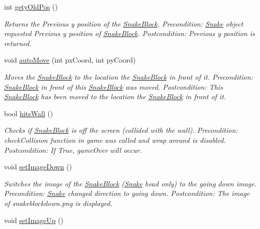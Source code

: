\begin{DoxyCompactItemize}
int \hyperlink{classSnakeBlock_af012358864082101b782a694ae7863a8}{gety\-Old\-Pos} ()
\begin{DoxyCompactList}\small\item\em \-Returns the \-Previous y position of the \hyperlink{classSnakeBlock}{\-Snake\-Block}. \-Precondition\-: \hyperlink{classSnake}{\-Snake} object requested \-Previous y position of \hyperlink{classSnakeBlock}{\-Snake\-Block}. \-Postcondition\-: \-Previous y position is returned. \end{DoxyCompactList}\item 
void \hyperlink{classSnakeBlock_a409a9f086ec935641087e498ff810bdd}{auto\-Move} (int px\-Coord, int py\-Coord)
\begin{DoxyCompactList}\small\item\em \-Moves the \hyperlink{classSnakeBlock}{\-Snake\-Block} to the location the \hyperlink{classSnakeBlock}{\-Snake\-Block} in front of it. \-Precondition\-: \hyperlink{classSnakeBlock}{\-Snake\-Block} in front of this \hyperlink{classSnakeBlock}{\-Snake\-Block} was moved. \-Postcondition\-: \-This \hyperlink{classSnakeBlock}{\-Snake\-Block} has been moved to the location the \hyperlink{classSnakeBlock}{\-Snake\-Block} in front of it. \end{DoxyCompactList}\item 
bool \hyperlink{classSnakeBlock_a0be7cbc3f967b97f72451c7ec60f48e2}{hits\-Wall} ()
\begin{DoxyCompactList}\small\item\em \-Checks if \hyperlink{classSnakeBlock}{\-Snake\-Block} is off the screen (collided with the wall). \-Precondition\-: check\-Collision function in game was called and wrap around is disabled. \-Postcondition\-: \-If \-True, game\-Over will occur. \end{DoxyCompactList}\item 
\hypertarget{classSnakeBlock_af95102dd649562682283e7bbced6d432}{void \hyperlink{classSnakeBlock_af95102dd649562682283e7bbced6d432}{set\-Image\-Down} ()}\label{classSnakeBlock_af95102dd649562682283e7bbced6d432}

\begin{DoxyCompactList}\small\item\em \-Switches the image of the \hyperlink{classSnakeBlock}{\-Snake\-Block} (\hyperlink{classSnake}{\-Snake} head only) to the going down image. \-Precondition\-: \hyperlink{classSnake}{\-Snake} changed direction to going down. \-Postcondition\-: \-The image of snakeblockdown.\-png is displayed. \end{DoxyCompactList}\item 
\hypertarget{classSnakeBlock_a146384071f87de9b6ea5a3bb4ea3fe58}{void \hyperlink{classSnakeBlock_a146384071f87de9b6ea5a3bb4ea3fe58}{set\-Image\-Up} ()}\label{classSnakeBlock_a146384071f87de9b6ea5a3bb4ea3fe58}


\end{DoxyCompactItemize}
